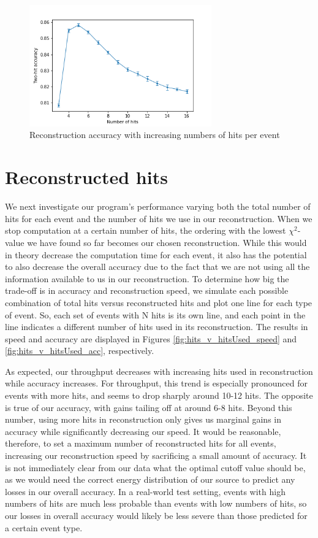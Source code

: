 \begin{figure}
    \centering
    \includegraphics[width=0.7\textwidth]{graphs/pi_hits_acc.png}
    \caption{Reconstruction accuracy with increasing numbers of hits per event}
    \label{fig:hits_acc}
\end{figure}


\section{Reconstructed hits}
\label{reconhits}
We next investigate our program's performance varying both the total number of hits for each event and the number of hits we use in our reconstruction. When we stop computation at a certain number of hits, the ordering with the lowest $\chi^2$-value we have found so far becomes our chosen reconstruction. While this would in theory decrease the computation time for each event, it also has the potential to also decrease the overall accuracy due to the fact that we are not using all the information available to us in our reconstruction. To determine how big the trade-off is in accuracy and reconstruction speed, we simulate each possible combination of total hits versus reconstructed hits and plot one line for each type of event. So, each set of events with N hits is its own line, and each point in the line indicates a different number of hits used in its reconstruction. The results in speed and accuracy are displayed in Figures \ref{fig:hits_v_hitsUsed_speed} and \ref{fig:hits_v_hitsUsed_acc}, respectively.

As expected, our throughput decreases with increasing hits used in reconstruction while accuracy increases. For throughput, this trend is especially pronounced for events with more hits, and seems to drop sharply around 10-12 hits. The opposite is true of our accuracy, with gains tailing off at around 6-8 hits. Beyond this number, using more hits in reconstruction only gives us marginal gains in accuracy while significantly decreasing our speed. It would be reasonable, therefore, to set a maximum number of reconstructed hits for all events, increasing our reconstruction speed by sacrificing a small amount of accuracy. It is not immediately clear from our data what the optimal cutoff value should be, as we would need the correct energy distribution of our source to predict any losses in our overall accuracy. In a real-world test setting, events with high numbers of hits are much less probable than events with low numbers of hits, so our losses in overall accuracy would likely be less severe than those predicted for a certain event type.

